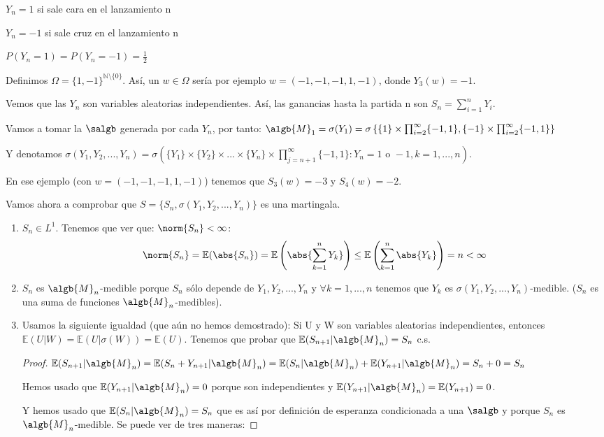 \documentclass{apuntes}
\begin{document}
\begin{example}
$Y_n = 1$ si sale cara en el lanzamiento n

$Y_n=-1$ si sale cruz en el lanzamiento n

$P(Y_n=1)=P(Y_n=-1)=\frac{1}{2}$

Definimos $\Omega = \{1,-1\}^{\mathbb{N}\setminus \{0\}}$. Así, un $w \in \Omega$ sería por ejemplo $w=(-1,-1,-1,1,-1)$, donde $Y_3(w)=-1$.

Vemos que las $Y_n$ son variables aleatorias independientes. Así, las ganancias hasta la partida n son $S_n=\sum_{i=1}^{n}Y_i$.

Vamos a tomar la $\salgb$ generada por cada $Y_n$, por tanto: $\algb{M}_1 = \sigma(Y_1)=\sigma\left\{\{1\}\times\prod_{i=2}^{\infty}\{-1,1\},\{-1\}\times\prod_{i=2}^{\infty}\{-1,1\} \right\}$

Y denotamos $\sigma(Y_1, Y_2,...,Y_n)=\sigma(\{Y_1\}\times\{Y_2\}\times ... \times\{Y_n\}\times \prod_{j=n+1}^{\infty}\{-1,1\} : Y_n= 1 \text{ o } -1, k=1,...,n )$.

En ese ejemplo (con $w=(-1,-1,-1,1,-1)$) tenemos que $S_3(w)=-3$ y $S_4(w)=-2$.

Vamos ahora a comprobar que $S=\{S_n, \sigma(Y_1, Y_2,...,Y_n)\}$ es una martingala.
\begin{enumerate}
\item $S_n \in L^1$. Tenemos que ver que: $\norm{S_n} < \infty$:
\[
\norm{S_n}=\mathbb{E}(\abs{S_n})=\mathbb{E}\left(\abs{\sum_{k=1}^{n} Y_k}\right) \leq \mathbb{E}\left(\sum_{k=1}^{n} \abs{Y_k}\right) = n < \infty
\]
\item $S_n$ es $\algb{M}_n$-medible porque $S_n$ sólo depende de $Y_1,Y_2,...,Y_n$ y $\forall k=1,...,n$ tenemos que $Y_k$ es $\sigma(Y_1,Y_2,...,Y_n)$-medible. ($S_n$ es una suma de funciones $\algb{M}_n$-medibles).
\item Usamos la siguiente igualdad (que aún no hemos demostrado): Si U y W son variables aleatorias independientes, entonces $\mathbb{E}(U|W)=\mathbb{E}(U|\sigma(W))=\mathbb{E}(U)$. Tenemos que probar que $\mathbb{E}(S_{n+1}|\algb{M}_n)=S_n$ c.s.
\begin{proof}
$\mathbb{E}(S_{n+1}|\algb{M}_n)= \mathbb{E}(S_{n} + Y_{n+1}|\algb{M}_n) =  \mathbb{E}(S_{n}|\algb{M}_n) + \mathbb{E}(Y_{n+1}|\algb{M}_n) = S_n + 0 = S_n$

Hemos usado que $\mathbb{E}(Y_{n+1}|\algb{M}_n)=0$ porque son independientes y $\mathbb{E}(Y_{n+1}|\algb{M}_n)=\mathbb{E}(Y_{n+1})=0$.

Y hemos usado que $\mathbb{E}(S_{n}|\algb{M}_n)=S_n$ que es así por definición de esperanza condicionada a una $\salgb$ y porque $S_n$ es $\algb{M}_n$-medible. Se puede ver de tres maneras: 


\end{proof}
\end{enumerate}
\end{example}
\end{document}

